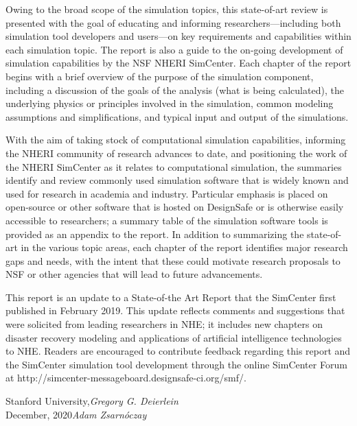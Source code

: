 Owing to the broad scope of the simulation topics, this state-of-art review is presented with the goal of educating and informing researchers---including both simulation tool developers and users---on key requirements and capabilities within each simulation topic. The report is also a guide to the on-going development of simulation capabilities by the NSF NHERI SimCenter. Each chapter of the report begins with a brief overview of the purpose of the simulation component, including a discussion of the goals of the analysis (what is being calculated), the underlying physics or principles involved in the simulation, common modeling assumptions and simplifications, and typical input and output of the simulations. 

With the aim of taking stock of computational simulation capabilities, informing the NHERI community of research advances to date, and positioning the work of the NHERI SimCenter as it relates to computational simulation, the summaries identify and review commonly used simulation software that is widely known and used for research in academia and industry. Particular emphasis is placed on open-source or other software that is hosted on DesignSafe or is otherwise easily accessible to researchers; a summary table of the simulation software tools is provided as an appendix to the report. In addition to summarizing the state-of-art in the various topic areas, each chapter of the report identifies major research gaps and needs, with the intent that these could motivate research proposals to NSF or other agencies that will lead to future advancements.

This report is an update to a State-of-the Art Report that the SimCenter first published in February 2019.  This update reflects comments and suggestions that were solicited from leading researchers in NHE; it includes new chapters on disaster recovery modeling and applications of artificial intelligence technologies to NHE.  Readers are encouraged to contribute feedback regarding this report and the SimCenter simulation tool development through the online SimCenter Forum at http://simcenter-messageboard.designsafe-ci.org/smf/.


\vspace{\baselineskip}
\begin{flushright}\noindent
Stanford University,\hfill {\it Gregory G. Deierlein}\\
December, 2020\hfill {\it Adam Zsarnóczay}\\
\end{flushright}


